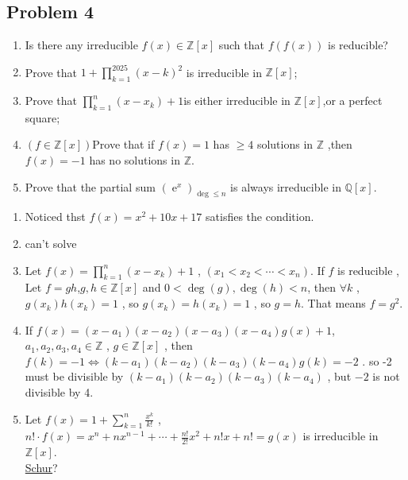 \documentclass[11pt]{ctexart}
\theoremstyle{definition}
\numberwithin{equation}{section}
\newcommand{\op}[1]{\operatorname{#1}}%
\newcommand{\QQ}{\mathbb{Q}}
\newcommand{\ZZ}{\mathbb{Z}}
\theoremstyle{definition}
\theoremstyle{remark}
\begin{document}
\subsection{Problem 4}
\begin{enumerate}
    \item Is there any irreducible $f(x)\in \ZZ[x]$ such that $f(f(x))$ is reducible?
    \item Prove that $1+\prod_{k=1}^{2025}(x-k)^2$ is irreducible in $\ZZ[x]$;
    \item Prove that $\prod_{k=1}^n(x-x_k)+1$is either irreducible in $\ZZ[x]$,or a perfect square;
    \item $(f\in \ZZ[x])$Prove that if $f(x)=1$ has $\geq 4$ solutions in $\ZZ$ ,then $f(x)=-1$ has no solutions in $\ZZ$.
    \item Prove that the partial sum $ (\op{e}^x)_{\op{deg}\leq n}$ is always irreducible in $\QQ[x]$.
\end{enumerate}
\begin{aaa}
    \begin{enumerate}
        \item Noticed thst $f(x)=x^2+10x+17$ satisfies the condition.
        \item can't solve
        \item Let $f(x)=\prod_{k=1}^n(x-x_k)+1$ , $(x_1 <x_2 < \cdots < x_n)$. If $f$ is reducible , Let $f=gh$,$g,h \in \ZZ[x]$ and $0 <\op{deg}(g),\op{deg}(h) < n$, then $\forall k$ , $g(x_k)h(x_k)=1$ , so $g(x_k)=h(x_k)=1$ , so $g=h$. That means $f=g^2$.
        \item If $f(x)=(x-a_1)(x-a_2)(x-a_3)(x-a_4)g(x)+1$, $a_1,a_2,a_3,a_4 \in \ZZ$ , $g \in \ZZ[x]$ , then $f(k)=-1 \Leftrightarrow (k-a_1)(k-a_2)(k-a_3)(k-a_4)g(k)=-2$ . so -2 must be divisible by $(k-a_1)(k-a_2)(k-a_3)(k-a_4)$ , but $-2$ is not divisible by 4.
        \item Let $f(x)=1+\sum_{k=1}^{n}\frac{x^k}{k!}$ , $n!\cdot f(x)=x^n + nx^{n-1} + \cdots + \frac{n!}{2!}x^2 + n!x + n!=g(x)$ is irreducible in $\ZZ[x]$.\\
            \href{https://www.zhihu.com/question/41438786?sort=created}{Schur}?
        
    \end{enumerate}
\end{aaa}
\end{document}
